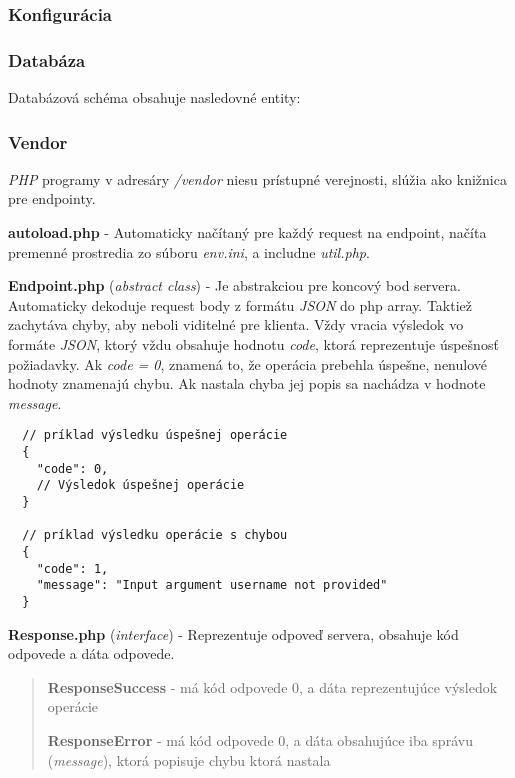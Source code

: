 \documentclass{article}
\begin{document}
\subsubsection{Konfigurácia}

\subsubsection{Databáza}

Databázová schéma obsahuje nasledovné entity:

\subsubsection{Vendor}

\newcommand{\filedesc}[1]{\vspace{0.3cm} \noindent \textbf{#1}}

\emph{PHP} programy v adresáry \emph{/vendor} niesu prístupné verejnosti, slúžia ako knižnica pre endpointy.

\filedesc{autoload.php} - Automaticky načítaný pre každý request na endpoint, načíta premenné prostredia zo súboru \emph{env.ini}, a includne \emph{util.php}.

\filedesc{Endpoint.php} (\emph{abstract class}) - Je abstrakciou pre koncový bod servera. Automaticky dekoduje request body z formátu \emph{JSON} do php array. Taktiež zachytáva chyby, aby neboli viditelné pre klienta. Vždy vracia výsledok vo formáte \emph{JSON}, ktorý vždu obsahuje hodnotu \emph{code}, ktorá reprezentuje úspešnosť požiadavky. Ak \emph{code = 0}, znamená to, že operácia prebehla úspešne, nenulové hodnoty znamenajú chybu. Ak nastala chyba jej popis sa nachádza v hodnote \emph{message}.

\begin{verbatim}
  // príklad výsledku úspešnej operácie
  {
    "code": 0,
    // Výsledok úspešnej operácie 
  }

  // príklad výsledku operácie s chybou
  {
    "code": 1,
    "message": "Input argument username not provided"
  }
\end{verbatim}

\filedesc{Response.php} (\emph{interface}) - Reprezentuje odpoveď servera, obsahuje kód odpovede a dáta odpovede.
\begin{quote}
  \filedesc{ResponseSuccess} - má kód odpovede 0, a dáta reprezentujúce výsledok operácie

  \filedesc{ResponseError} - má kód odpovede 0, a dáta obsahujúce iba správu (\emph{message}), ktorá popisuje chybu ktorá nastala
\end{quote}
\end{document}
